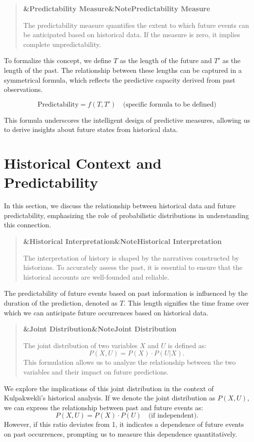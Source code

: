 \documentclass[a4paper]{article}
\newcommand{\boxheading}[1]{%
  \par\smallskip
  \noindent\textbf{\ifx&#1&Note\else#1\fi}\par
  \smallskip
}
\newenvironment{defbox}[1][]{%
  \begin{quote}\color{green!40!black}\boxheading{#1}\normalcolor
}{\end{quote}}
\newenvironment{rembox}[1][]{%
  \begin{quote}\color{black!70}\boxheading{#1}\normalcolor
}{\end{quote}}
\begin{document}
\begin{defbox}[Predictability Measure]
The predictability measure quantifies the extent to which future events can be anticipated based on historical data. If the measure is zero, it implies complete unpredictability.
\end{defbox}

To formalize this concept, we define \( T \) as the length of the future and \( T' \) as the length of the past. The relationship between these lengths can be captured in a symmetrical formula, which reflects the predictive capacity derived from past observations.

\begin{equation}
\text{Predictability} = f(T, T') \quad \text{(specific formula to be defined)}
\end{equation}

This formula underscores the intelligent design of predictive measures, allowing us to derive insights about future states from historical data.

\section{Historical Context and Predictability}
In this section, we discuss the relationship between historical data and future predictability, emphasizing the role of probabilistic distributions in understanding this connection.

\begin{rembox}[Historical Interpretation]
The interpretation of history is shaped by the narratives constructed by historians. To accurately assess the past, it is essential to ensure that the historical accounts are well-founded and reliable.
\end{rembox}

The predictability of future events based on past information is influenced by the duration of the prediction, denoted as \( T \). This length signifies the time frame over which we can anticipate future occurrences based on historical data. 

\begin{defbox}[Joint Distribution]
The joint distribution of two variables \( X \) and \( U \) is defined as:
\[
P(X, U) = P(X) \cdot P(U|X).
\]
This formulation allows us to analyze the relationship between the two variables and their impact on future predictions.
\end{defbox}

We explore the implications of this joint distribution in the context of Kulpakwekli's historical analysis. If we denote the joint distribution as \( P(X, U) \), we can express the relationship between past and future events as:
\[
P(X, U) = P(X) \cdot P(U) \quad \text{(if independent)}.
\]
However, if this ratio deviates from 1, it indicates a dependence of future events on past occurrences, prompting us to measure this dependence quantitatively.
\end{document}
